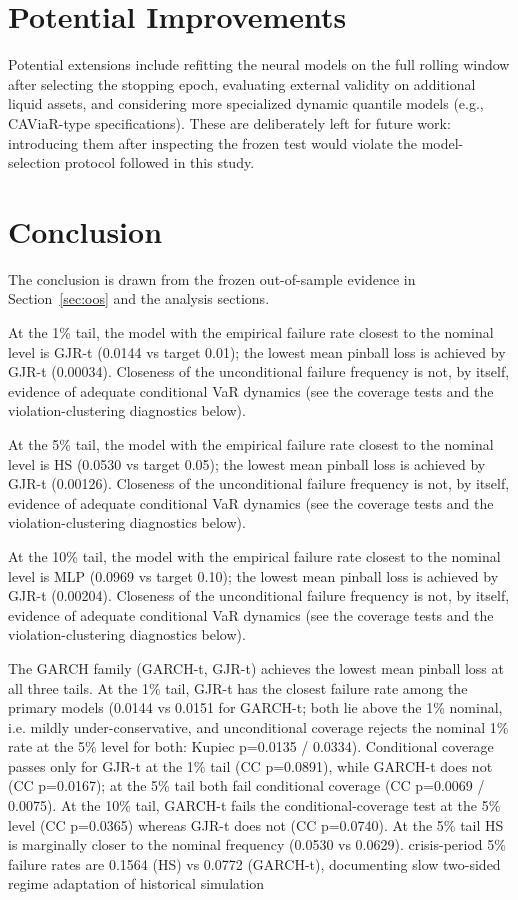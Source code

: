 \documentclass[11pt]{article}
\begin{document}
\section{Potential Improvements}
Potential extensions include refitting the neural models on the full rolling window after selecting the stopping epoch, evaluating external validity on additional liquid assets, and considering more specialized dynamic quantile models (e.g., CAViaR-type specifications). These are deliberately left for future work: introducing them after inspecting the frozen test would violate the model-selection protocol followed in this study.

\section{Conclusion}
The conclusion is drawn from the frozen out-of-sample evidence in Section~\ref{sec:oos} and the analysis sections.

At the 1\% tail, the model with the empirical failure rate closest to the nominal level is GJR-t (0.0144 vs target 0.01); the lowest mean pinball loss is achieved by GJR-t (0.00034). Closeness of the unconditional failure frequency is not, by itself, evidence of adequate conditional VaR dynamics (see the coverage tests and the violation-clustering diagnostics below).

At the 5\% tail, the model with the empirical failure rate closest to the nominal level is HS (0.0530 vs target 0.05); the lowest mean pinball loss is achieved by GJR-t (0.00126). Closeness of the unconditional failure frequency is not, by itself, evidence of adequate conditional VaR dynamics (see the coverage tests and the violation-clustering diagnostics below).

At the 10\% tail, the model with the empirical failure rate closest to the nominal level is MLP (0.0969 vs target 0.10); the lowest mean pinball loss is achieved by GJR-t (0.00204). Closeness of the unconditional failure frequency is not, by itself, evidence of adequate conditional VaR dynamics (see the coverage tests and the violation-clustering diagnostics below).

The GARCH family (GARCH-t, GJR-t) achieves the lowest mean pinball loss at all three tails. At the 1\% tail, GJR-t has the closest failure rate among the primary models (0.0144 vs 0.0151 for GARCH-t; both lie above the 1\% nominal, i.e. mildly under-conservative, and unconditional coverage rejects the nominal 1\% rate at the 5\% level for both: Kupiec p=0.0135 / 0.0334). Conditional coverage passes only for GJR-t at the 1\% tail (CC p=0.0891), while GARCH-t does not (CC p=0.0167); at the 5\% tail both fail conditional coverage (CC p=0.0069 / 0.0075). At the 10\% tail, GARCH-t fails the conditional-coverage test at the 5\% level (CC p=0.0365) whereas GJR-t does not (CC p=0.0740). At the 5\% tail HS is marginally closer to the nominal frequency (0.0530 vs 0.0629). crisis-period 5\% failure rates are 0.1564 (HS) vs 0.0772 (GARCH-t), documenting slow two-sided regime adaptation of historical simulation
\end{document}

